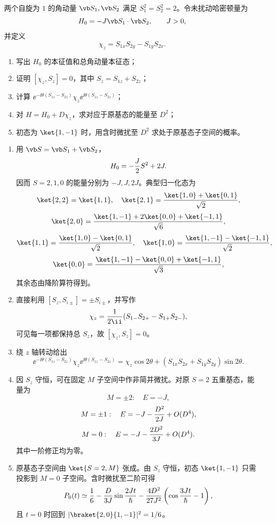 
\begin{question}
两个自旋为 $1$ 的角动量 $\vb S_1,\vb S_2$ 满足 $S_1^2=S_2^2=2$。令未扰动哈密顿量为
\[
  H_0=-J\vb S_1\cdot\vb S_2,
  \qquad J>0,
\]
并定义
\[
  \chi_z=S_{1x}S_{2y}-S_{1y}S_{2x}.
\]
\begin{enumerate}
  \item 写出 $H_0$ 的本征值和总角动量本征态；
  \item 证明 $[\chi_z,S_z]=0$，其中 $S_z=S_{1z}+S_{2z}$；
  \item 计算 $\ee^{-\ii\theta(S_{1z}-S_{2z})}\chi_z\ee^{\ii\theta(S_{1z}-S_{2z})}$；
  \item 对 $H=H_0+D\chi_z$，求对应于原基态的能量至 $D^2$；
  \item 初态为 $\ket{1,-1}$ 时，用含时微扰至 $D^2$ 求处于原基态子空间的概率。
\end{enumerate}
\begin{solution}
\begin{enumerate}
  \item 用 $\vb S=\vb S_1+\vb S_2$，
  \[
    H_0=-{J\over2}S^2+2J.
  \]
  因而 $S=2,1,0$ 的能量分别为 $-J,J,2J$。典型归一化态为
  \[
    \ket{2,2}=\ket{1,1},\quad
    \ket{2,1}={\ket{1,0}+\ket{0,1}\over\sqrt2},
  \]
  \[
    \ket{2,0}={\ket{1,-1}+2\ket{0,0}+\ket{-1,1}\over\sqrt6},
  \]
  \[
    \ket{1,1}={\ket{1,0}-\ket{0,1}\over\sqrt2},\quad
    \ket{1,0}={\ket{1,-1}-\ket{-1,1}\over\sqrt2},
  \]
  \[
    \ket{0,0}={\ket{1,-1}-\ket{0,0}+\ket{-1,1}\over\sqrt3},
  \]
  其余态由降阶算符得到。
  \item 直接利用 $[S_z,S_{i\pm}]=\pm S_{i\pm}$，并写作
  \[
    \chi_z={1\over2\ii}(S_{1-}S_{2+}-S_{1+}S_{2-}),
  \]
  可见每一项都保持总 $S_z$，故 $[\chi_z,S_z]=0$。
  \item 绕 $z$ 轴转动给出
  \[
    \ee^{-\ii\theta(S_{1z}-S_{2z})}\chi_z\ee^{\ii\theta(S_{1z}-S_{2z})}
    =\chi_z\cos2\theta+(S_{1x}S_{2x}+S_{1y}S_{2y})\sin2\theta.
  \]
  \item 因 $S_z$ 守恒，可在固定 $M$ 子空间中作非简并微扰。对原 $S=2$ 五重基态，能量为
  \[
    M=\pm2:\quad E=-J,
  \]
  \[
    M=\pm1:\quad E=-J-{D^2\over2J}+O(D^4),
  \]
  \[
    M=0:\quad E=-J-{2D^2\over3J}+O(D^4).
  \]
  其中一阶修正均为零。
  \item 原基态子空间由 $\ket{S=2,M}$ 张成。由 $S_z$ 守恒，初态 $\ket{1,-1}$ 只需投影到 $M=0$ 子空间。含时微扰至二阶可得
  \[
    P_0(t)\simeq {1\over6}-{D\over3J}\sin{2Jt\over\hbar}
    -{4D^2\over27J^2}\left(\cos{3Jt\over\hbar}-1\right),
  \]
  且 $t=0$ 时回到 $|\braket{2,0}{1,-1}|^2=1/6$。
\end{enumerate}
\end{solution}
\end{question}

